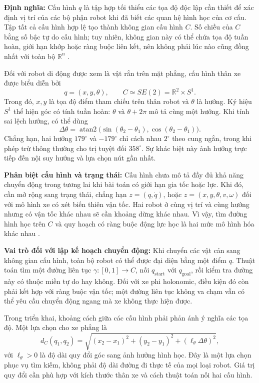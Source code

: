 \documentclass[12pt,a4paper,oneside]{report}
\begin{document}
\textbf{Định nghĩa:} Cấu hình \(q\) là tập hợp tối thiểu các tọa độ độc lập cần thiết để xác định vị trí của các bộ phận robot khi đã biết các quan hệ hình học của cơ cấu. Tập tất cả cấu hình hợp lệ tạo thành không gian cấu hình \(C\). Số chiều của \(C\) bằng số bậc tự do cấu hình; tuy nhiên, không gian này có thể chứa tọa độ tuần hoàn, giới hạn khớp hoặc ràng buộc liên kết, nên không phải lúc nào cũng đồng nhất với toàn bộ \(\mathbb{R}^{n}\) \cite{lavalle-planning-2006}.

Đối với robot di động được xem là vật rắn trên mặt phẳng, cấu hình thân xe được biểu diễn bởi
\[
  q=(x,y,\theta),\qquad C\simeq SE(2)=\mathbb{R}^{2}\times S^{1}.
\]
Trong đó, \(x,y\) là tọa độ điểm tham chiếu trên thân robot và \(\theta\) là hướng. Ký hiệu \(S^{1}\) thể hiện góc có tính tuần hoàn: \(\theta\) và \(\theta+2\pi\) mô tả cùng một hướng. Khi tính sai lệch hướng, có thể dùng
\[
  \Delta\theta=\operatorname{atan2}
  \bigl(\sin(\theta_2-\theta_1),\cos(\theta_2-\theta_1)\bigr).
\]
Chẳng hạn, hai hướng \(179^{\circ}\) và \(-179^{\circ}\) chỉ cách nhau \(2^{\circ}\) theo cung ngắn, trong khi phép trừ thông thường cho trị tuyệt đối \(358^{\circ}\). Sự khác biệt này ảnh hưởng trực tiếp đến nội suy hướng và lựa chọn nút gần nhất.

\textbf{Phân biệt cấu hình và trạng thái:} Cấu hình chưa mô tả đầy đủ khả năng chuyển động trong tương lai khi bài toán có giới hạn gia tốc hoặc lực. Khi đó, cần mở rộng sang trạng thái, chẳng hạn \(z=(q,\dot q)\), hoặc \(z=(x,y,\theta,v,\omega)\) đối với mô hình xe có xét biến thiên vận tốc. Hai robot ở cùng vị trí và cùng hướng nhưng có vận tốc khác nhau sẽ cần khoảng dừng khác nhau. Vì vậy, tìm đường hình học trên \(C\) và quy hoạch có ràng buộc động lực học là hai mức mô hình hóa khác nhau \cite{lavalle-planning-2006}.

\textbf{Vai trò đối với lập kế hoạch chuyển động:} Khi chuyển các vật cản sang không gian cấu hình, toàn bộ robot có thể được đại diện bằng một điểm \(q\). Thuật toán tìm một đường liên tục \(\gamma:[0,1]\to C\), nối \(q_{\mathrm{start}}\) với \(q_{\mathrm{goal}}\), rồi kiểm tra đường này có thuộc miền tự do hay không. Đối với xe phi holonomic, điều kiện đó còn phải kết hợp với ràng buộc vận tốc; một đường liên tục không va chạm vẫn có thể yêu cầu chuyển động ngang mà xe không thực hiện được.

Trong triển khai, khoảng cách giữa các cấu hình phải phản ánh ý nghĩa các tọa độ. Một lựa chọn cho xe phẳng là
\[
  d_C(q_1,q_2)=\sqrt{(x_2-x_1)^2+(y_2-y_1)^2+
       (\ell_{\theta}\Delta\theta)^2},
\]
với \(\ell_{\theta}>0\) là độ dài quy đổi góc sang ảnh hưởng hình học. Đây là một lựa chọn phục vụ tìm kiếm, không phải độ dài đường đi thực tế của mọi loại robot. Giá trị quy đổi cần phù hợp với kích thước thân xe và cách thuật toán nối hai cấu hình.
\end{document}

